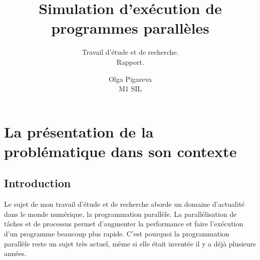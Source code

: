 \documentclass[12pt]{scrartcl}
\begin{document}
\pagestyle{fancy}
\rhead{  }

\title{%
Simulation d'exécution de programmes parallèles\\
\large } 

\subtitle{ Travail d'étude et de recherche. \\Rapport. }
\author{Olga Pigareva\\
M1 SIL} %





\maketitle

\newpage

\tableofcontents %

\newpage %
\section{La présentation de la problématique dans son contexte}

\subsection{Introduction}
Le sujet de mon travail d'étude et de recherche aborde un domaine d'actualité dans le monde numérique, la programmation parallèle.
La parallélisation de tâches et de processus permet d'augmenter la performance et faire l'exécution d'un programme beaucoup plus rapide. 
C'est pourquoi la programmation parallèle reste un sujet très actuel, même si elle était inventée il y a déjà plusieurs années.\\
\end{document}
